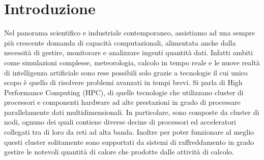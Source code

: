 \chapter{Introduzione}
Nel panorama scientifico e industriale contemporaneo, assistiamo ad una sempre più crescente domanda di capacità computazionali, alimentata anche dalla necessità di gestire, monitorare e analizzare ingenti quantità dati. Infatti ambiti come simulazioni complesse, meteorologia, calcolo in tempo reale e le nuove realtà di intelligenza artificiale sono rese possibili solo grazie a tecnologie il cui unico scopo è quello di risolvere problemi 
avanzati in tempi brevi. 
Si parla di High Performance Computing (HPC), di quelle tecnologie che utilizzano cluster di processori e componenti hardware ad alte prestazioni in grado di processare parallelamente dati multidimensionali.
In particolare, sono composte da cluster di nodi, ognuno dei quali contiene diverse decine di processori ed acceleratori collegati tra di loro da reti ad alta banda.
Inoltre per poter funzionare al meglio questi cluster solitamente sono supportati da sistemi di raffreddamento in grado gestire le notevoli quantità di calore che prodotte dalle attività di calcolo. 

